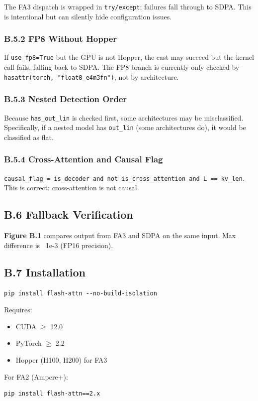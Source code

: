 The FA3 dispatch is wrapped in \texttt{try/except}; failures fall through to SDPA. 
This is intentional but can silently hide configuration issues.

\subsubsection{B.5.2 FP8 Without Hopper}

If \texttt{use\_fp8=True} but the GPU is not Hopper, the cast may succeed but the 
kernel call fails, falling back to SDPA. The FP8 branch is currently only 
checked by \texttt{hasattr(torch, "float8\_e4m3fn")}, not by architecture.

\subsubsection{B.5.3 Nested Detection Order}

Because \texttt{has\_out\_lin} is checked first, some architectures may be 
misclassified. Specifically, if a nested model has \texttt{out\_lin} (some 
architectures do), it would be classified as flat.

\subsubsection{B.5.4 Cross-Attention and Causal Flag}

\texttt{causal\_flag = is\_decoder and not is\_cross\_attention and L == kv\_len}. This 
is correct: cross-attention is not causal.

\subsection{B.6 Fallback Verification}

\textbf{Figure B.1} compares output from FA3 and SDPA on the same input. Max 
difference is ~1e-3 (FP16 precision).

\subsection{B.7 Installation}

\begin{lstlisting}
pip install flash-attn --no-build-isolation
\end{lstlisting}

Requires:
\begin{itemize}
\item CUDA $\ge$ 12.0
\item PyTorch $\ge$ 2.2
\item Hopper (H100, H200) for FA3

\end{itemize}
For FA2 (Ampere+):
\begin{lstlisting}
pip install flash-attn==2.x
\end{lstlisting}

